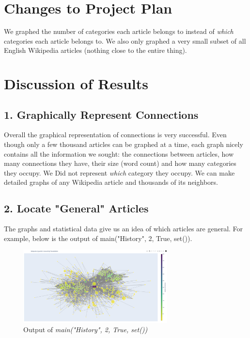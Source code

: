 \documentclass[fontsize=11pt]{article}
\begin{document}
    \section*{Changes to Project Plan}
    
    We graphed the number of categories each article belongs to instead of \textit{which} categories each article belongs to. We also only graphed a very small subset of all English Wikipedia articles (nothing close to the entire thing). 
    
    
    
    \section*{Discussion of Results}
    
    \subsection*{ 1. Graphically Represent Connections}
    Overall the graphical representation of connections is very successful. Even though only a few thousand articles can be graphed at a time, each graph nicely contains all the information we sought: the connections between articles, how many connections they have, their size (word count) and how many categories they occupy. We Did not represent \textit{which} category they occupy. We can make detailed graphs of any Wikipedia article and thousands of its neighbors. 
    
    \subsection*{ 2. Locate "General" Articles}
    The graphs and statistical data give us an idea of which articles are general. For example, below is the output of main("History", 2, True, set()). 
    
    \begin{figure}[h!]
    \begin{center}
  		\includegraphics[width=0.7\textwidth]{HistoryD2.png}
  		\caption{Output of \textit{main("History", 2, True, set())}}
  		\label{fig:}
  	\end{center}
	\end{figure}
	
\end{document}
